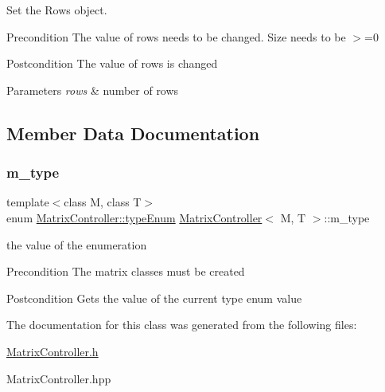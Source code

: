Set the Rows object. 

\begin{DoxyPrecond}{Precondition}
The value of rows needs to be changed. Size needs to be $>$=0 
\end{DoxyPrecond}
\begin{DoxyPostcond}{Postcondition}
The value of rows is changed 
\end{DoxyPostcond}

\begin{DoxyParams}{Parameters}
{\em rows} & number of rows \\
\hline
\end{DoxyParams}


\subsection{Member Data Documentation}
\mbox{\label{class_matrix_controller_aacbda7580c5c72ee63cf49ada64b77e7}} 
\subsubsection{\texorpdfstring{m\_type}{m\_type}}
{\footnotesize\ttfamily template$<$class M, class T$>$ \\
enum \mbox{\hyperlink{class_matrix_controller_aca66836084cbc7807dbaea879ac31fc7}{Matrix\+Controller\+::type\+Enum}}
   \mbox{\hyperlink{class_matrix_controller}{Matrix\+Controller}}$<$ M, T $>$\+::m\+\_\+type}



the value of the enumeration 

\begin{DoxyPrecond}{Precondition}
The matrix classes must be created 
\end{DoxyPrecond}
\begin{DoxyPostcond}{Postcondition}
Gets the value of the current type enum value 
\end{DoxyPostcond}


The documentation for this class was generated from the following files\+:\begin{DoxyCompactItemize}
\item 
\mbox{\hyperlink{_matrix_controller_8h}{Matrix\+Controller.\+h}}\item 
Matrix\+Controller.\+hpp\end{DoxyCompactItemize}
